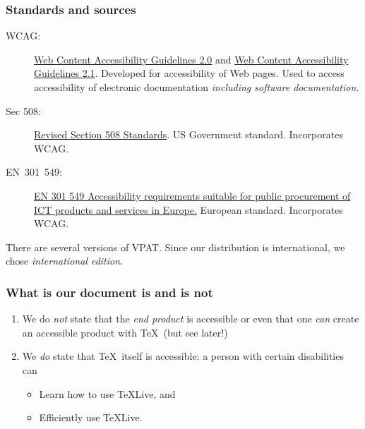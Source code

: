 \documentclass{beamer}
\begin{document}
\begin{frame}
  \frametitle{Standards and sources}

  \begin{description}
  \item[WCAG:] \href{http://www.w3.org/TR/2008/REC-WCAG20-20081211}{Web
      Content Accessibility Guidelines 2.0} and
    \href{https://www.w3.org/TR/WCAG21}{Web Content Accessibility
      Guidelines 2.1}.  Developed for accessibility of Web pages.
    Used to access accessibility of electronic documentation
    \emph{including software documentation.}
    \item[Sec 508:]
      \href{https://www.access-board.gov/guidelines-and-standards/communications-and-it/about-the-ict-refresh/final-rule/text-of-the-standards-and-guidelines}{Revised
        Section 508 Standards}.  US Government standard.
      Incorporates WCAG.
\item[EN~301~549:] \href{https://www.etsi.org/deliver/etsi_en/301500_301599/301549/03.01.01_60/en_301549v030101p.pdf}{EN
  301 549 Accessibility requirements suitable for public procurement
  of ICT products and services in Europe.}  European
standard. Incorporates WCAG.
\end{description}

There are several versions of VPAT\textsuperscript{\textregistered}.
Since our distribution is international, we chose \emph{international
  edition}.  

\end{frame}

\begin{frame}
  \frametitle{What is our document is and is not}

  \begin{enumerate}
  \item We do \emph{not} state that the \emph{end product} is
    accessible or even that one \emph{can} create an accessible
    product with \TeX\ (but see later!)
  \item We \emph{do} state that \TeX\ itself is accessible:  a person
    with certain disabilities can
    \begin{itemize}
    \item Learn how to use \TeX Live, and
    \item Efficiently use \TeX Live.
    \end{itemize}

  \end{enumerate}
  
\end{frame}
\end{document}
